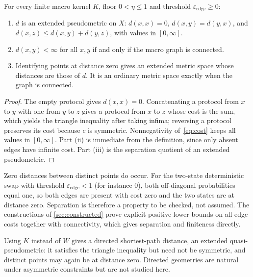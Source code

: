 \begin{proposition}
\label{prop:metric}
For every finite macro kernel $K$, floor $0<\eta\le1$ and threshold $\varepsilon_{\mathrm{edge}}\ge0$:
\begin{enumerate}[label=(\roman*)]
\item $d$ is an extended pseudometric on $X$: $d(x,x)=0$, $d(x,y)=d(y,x)$, and $d(x,z)\le d(x,y)+d(y,z)$, with values in $[0,\infty]$.
\item $d(x,y)<\infty$ for all $x,y$ if and only if the macro graph is connected.
\item Identifying points at distance zero gives an extended metric space whose distances are those of $d$.
It is an ordinary metric space exactly when the graph is connected.
\end{enumerate}
\end{proposition}

\begin{proof}
The empty protocol gives $d(x,x)=0$.
Concatenating a protocol from $x$ to $y$ with one from $y$ to $z$ gives a protocol from $x$ to $z$ whose cost is the sum, which yields the triangle inequality after taking infima; reversing a protocol preserves its cost because $c$ is symmetric.
Nonnegativity of~\eqref{eq:cost} keeps all values in $[0,\infty]$.
Part (ii) is immediate from the definition, since only absent edges have infinite cost.
Part (iii) is the separation quotient of an extended pseudometric.
\end{proof}


Zero distances between distinct points do occur.
For the two-state deterministic swap with threshold $\varepsilon_{\mathrm{edge}}<1$ (for instance $0$), both off-diagonal probabilities equal one, so both edges are present with cost zero and the two states are at distance zero.
Separation is therefore a property to be checked, not assumed.
The constructions of \cref{sec:constructed} prove explicit positive lower bounds on all edge costs together with connectivity, which gives separation and finiteness directly.

\begin{remark}
Using $K$ instead of $W$ gives a directed shortest-path distance, an extended quasi-pseudometric: it satisfies the triangle inequality but need not be symmetric, and distinct points may again be at distance zero.
Directed geometries are natural under asymmetric constraints but are not studied here.
\end{remark}
